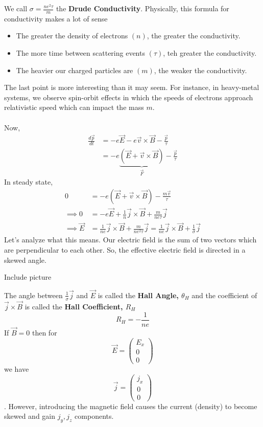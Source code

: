\documentclass[11pt]{article}
\begin{document}
We call $\sigma = \frac{ne^2 \tau}{m}$ the \textbf{Drude Conductivity}. Physically, this formula for conductivity makes a lot of sense 
\begin{itemize}
  \item The greater the density of electrons $(n)$, the greater the conductivity.
  \item The more time between scattering events $(\tau)$, teh greater the conductivity.
  \item The heavier our charged particles are $(m)$, the weaker the conductivity.
\end{itemize}
The last point is more interesting than it may seem. For instance, in heavy-metal systems, we observe spin-orbit effects in which the speeds of electrons approach relativistic speed which can impact the mass $m$.
\\
\\
Now,
\begin{align*}
  \frac{d\vec{p}}{dt} &= -e\vec{E} - e\vec{v} \times \vec{B} - \frac{\vec{p}}{\tau} \\
  &= -e \underbrace{\left(\vec{E} + \vec{v} \times \vec{B}\right)}_{\vec{F}} - \frac{\vec{p}}{\tau} 
\end{align*}
In steady state,
\begin{align*}
  0 &= -e \left( \vec{E} + \vec{v} \times \vec{B} \right) - \frac{m\vec{v}}{\tau} \\
  \implies 0 &= -e\vec{E} + \frac{1}{n} \vec{j} \times \vec{B} + \frac{m}{ne\tau} \vec{j} \\
  \implies \vec{E} &= \frac{1}{ne} \vec{j} \times \vec{B} + \frac{m}{ne^2 \tau} \vec{j} = \frac{1}{ne} \vec{j} \times \vec{B}
  + \frac{1}{\sigma} \vec{j} 
\end{align*}
Let's analyze what this means. Our electric field is the sum of two vectors which are perpendicular to each other. So, the effective electric field is directed in a skewed angle.
\begin{center}
  Include picture
\end{center}
The angle between $\frac{1}{\sigma} \vec{j}$ and $\vec{E}$ is called the \textbf{Hall Angle, $\theta_H$} and the coefficient of $\vec{j} \times \vec{B}$ is called the \textbf{Hall Coefficient, $R_H$} \[ R_H = -\frac{1}{ne} \] If $\vec{B} = 0$ then for \[ \vec{E} = \begin{pmatrix}
  E_x \\ 0 \\ 0
\end{pmatrix} \] we have \[ \vec{j} = \begin{pmatrix}
  j_x \\ 0 \\ 0
\end{pmatrix} \]. However, introducing the magnetic field causes the current (density) to become skewed and gain $j_y, j_z$ components.
\end{document}
